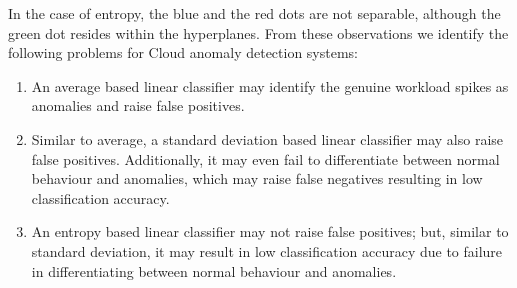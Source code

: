 In the case of entropy, the blue and the red dots are not separable, although the green dot resides within the hyperplanes.
From these observations we identify the following problems for Cloud anomaly detection systems:
\begin{enumerate}[{(1)}] 
\item An average based linear classifier may identify the genuine workload spikes as anomalies and raise false positives.
\item Similar to average, a standard deviation based linear classifier may also raise false positives. Additionally, it may even fail to differentiate between normal behaviour and anomalies, which may raise false negatives resulting in low classification accuracy.  
\item An entropy based linear classifier may not raise false positives; but, similar to standard deviation, it may result in low classification accuracy due to failure in differentiating between normal behaviour and anomalies.

\end{enumerate}

